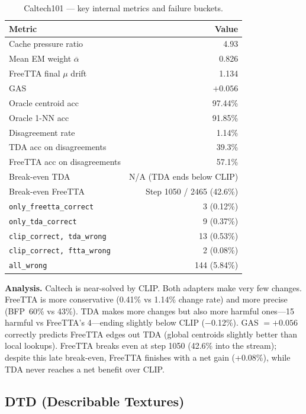 \documentclass[12pt,a4paper]{article}
\newcommand{\1}{\mathbf{1}}
\begin{document}
\begin{table}[H]
\centering
\caption{Caltech101 --- key internal metrics and failure buckets.}
\label{tab:caltech_internal}
\begin{tabular}{@{}lr@{}}
\toprule
Metric & Value \\
\midrule
Cache pressure ratio        & 4.93 \\
Mean EM weight $\overline{\alpha}$ & 0.826 \\
FreeTTA final $\mu$ drift   & 1.134 \\
GAS                         & $+0.056$ \\
Oracle centroid acc         & 97.44\% \\
Oracle 1-NN acc             & 91.85\% \\
Disagreement rate           & 1.14\% \\
TDA acc on disagreements    & 39.3\% \\
FreeTTA acc on disagreements & 57.1\% \\
Break-even TDA              & N/A (TDA ends below CLIP) \\
Break-even FreeTTA          & Step 1050 / 2465 (42.6\%) \\
\midrule
\texttt{only\_freetta\_correct} & 3 (0.12\%) \\
\texttt{only\_tda\_correct}     & 9 (0.37\%) \\
\texttt{clip\_correct, tda\_wrong} & 13 (0.53\%) \\
\texttt{clip\_correct, ftta\_wrong} & 2 (0.08\%) \\
\texttt{all\_wrong}             & 144 (5.84\%) \\
\bottomrule
\end{tabular}
\end{table}

\textbf{Analysis.} Caltech is near-solved by CLIP.
Both adapters make very few changes.
FreeTTA is more conservative (0.41\% vs 1.14\% change rate) and more precise (BFP~60\% vs 43\%).
TDA makes more changes but also more harmful ones---15 harmful vs FreeTTA's 4---ending slightly below CLIP ($-$0.12\%).
GAS $= +0.056$ correctly predicts FreeTTA edges out TDA (global centroids slightly better than local lookups).
FreeTTA breaks even at step 1050 (42.6\% into the stream); despite this late break-even, FreeTTA finishes with a net gain (+0.08\%), while TDA never reaches a net benefit over CLIP.

\subsection{DTD (Describable Textures)}
\end{document}

